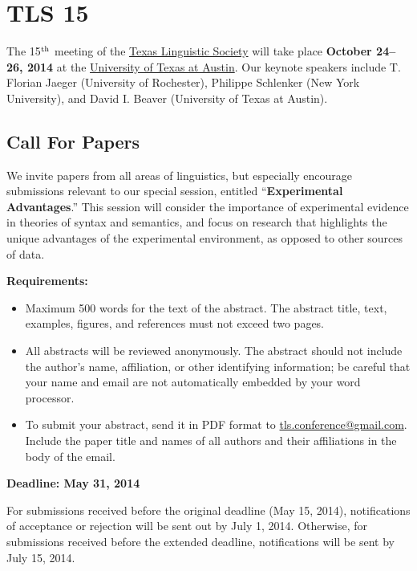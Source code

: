 \documentclass[11pt]{article}
\begin{document}
\clearpage\thispagestyle{empty}

\section*{TLS 15}

The 15$^{\rm th}$ meeting of the \href{http://tls.ling.utexas.edu}{Texas Linguistic Society} will take place \textbf{October 24--26, 2014} at the \href{https://www.utexas.edu/cola/depts/linguistics/}{University of Texas at Austin}. Our keynote speakers include T. Florian Jaeger (University of Rochester), Philippe Schlenker (New York University), and David I. Beaver (University of Texas at Austin).

\subsection*{Call For Papers}

We invite papers from all areas of linguistics, but especially encourage submissions relevant to our special session, entitled ``\textbf{Experimental Advantages}.''
This session will consider the importance of experimental evidence in theories of syntax and semantics, and focus on research that highlights the unique advantages of the experimental environment, as opposed to other sources of data.

\bigskip\noindent
\textbf{Requirements:}

\begin{itemize}
  \setlength{\itemsep}{2pt}
  \setlength{\parskip}{2pt}
  \item Maximum 500 words for the text of the abstract. The abstract title, text, examples, figures, and references must not exceed two pages.
  \item All abstracts will be reviewed anonymously. The abstract should not include the author’s name, affiliation, or other identifying information; be careful that your name and email are not automatically embedded by your word processor.
  \item To submit your abstract, send it in PDF format to \href{mailto:tls.conference@gmail.com}{tls.conference@gmail.com}. Include the paper title and names of all authors and their affiliations in the body of the email.
\end{itemize}

\textbf{Deadline: May 31, 2014}

\bigskip\noindent
For submissions received before the original deadline (May 15, 2014), notifications of acceptance or rejection will be sent out by July 1, 2014. Otherwise, for submissions received before the extended deadline, notifications will be sent by July 15, 2014.
\end{document}
